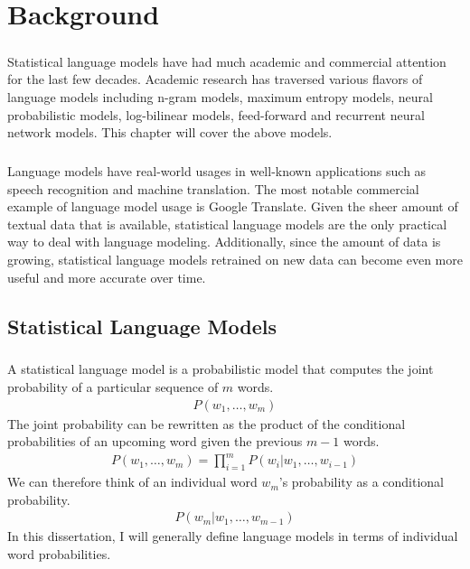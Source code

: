 
\chapter{Background}
\paragraph{}
Statistical language models have had much academic and commercial attention for the last few decades. Academic research has traversed various flavors of language models including n-gram models, maximum entropy models, neural probabilistic models, log-bilinear models, feed-forward and recurrent neural network models. This chapter will cover the above models.
\paragraph{}
Language models have real-world usages in well-known applications such as speech recognition and machine translation. The most notable commercial example of language model usage is Google Translate. Given the sheer amount of textual data that is available, statistical language models are the only practical way to deal with language modeling. Additionally, since the amount of data is growing,  statistical language models retrained on new data can become even more useful and more accurate over time.

\section{Statistical Language Models}
\paragraph{}
A statistical language model is a probabilistic model that computes the joint probability of a particular sequence of  $m$ words.  
\begin{align}
P(w_1, \dots ,w_m)
\end{align}
The joint probability can be rewritten as the product of the conditional probabilities of an upcoming word given the previous $m-1$ words.
\begin{align}
P(w_1, \dots ,w_m) = \prod_{i=1}^m P(w_i | w_1,\dots, w_{i-1})
\end{align}
We can therefore think of an individual word $w_m$'s probability as a conditional probability.
\begin{align}
P(w_m | w_1,\dots, w_{m-1})
\end{align}
In this dissertation, I will generally define language models in terms of individual word probabilities.
